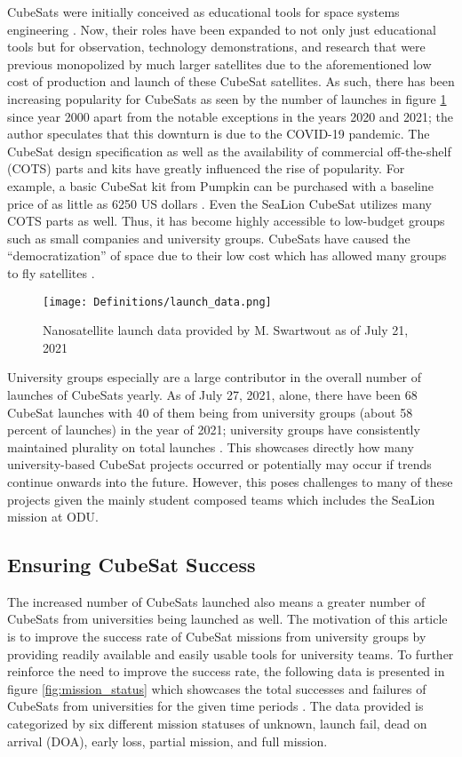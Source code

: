 \documentclass[journal,article,submit,pdftex,moreauthors]{Definitions/mdpi}
\begin{document}
CubeSats were initially conceived as educational tools for space systems engineering \cite{heidt_new}.  Now, their roles have been expanded to not only just educational tools but for observation, technology demonstrations, and research that were previous monopolized by much larger satellites due to the aforementioned low cost of production and launch of these CubeSat satellites.  As such, there has been increasing popularity for CubeSats as seen by the number of launches in figure \ref{fig:launch_data} since year 2000 \cite{swartwout_data} apart from the notable exceptions in the years 2020 and 2021; the author speculates that this downturn is due to the COVID-19 pandemic.  The CubeSat design specification \cite{cds_rev14} as well as the availability of commercial off-the-shelf (COTS) parts and kits have greatly influenced the rise of popularity.  For example, a basic CubeSat kit from Pumpkin can be purchased with a baseline price of as little as 6250 US dollars \cite{pumpkin_cubesat}.  Even the SeaLion CubeSat utilizes many COTS parts as well.  Thus, it has become highly accessible to low-budget groups such as small companies and university groups.  CubeSats have caused the “democratization” of space due to their low cost which has allowed many groups to fly satellites \cite{cubesat_handbook}.  

\begin{figure}[H]
    \texttt{[image: Definitions/launch\_data.png]}
    \caption{Nanosatellite launch data provided by M. Swartwout as of July 21, 2021 \cite{swartwout_data}}
	\label{fig:launch_data}
    \end{figure}
	\noindent   
\unskip

University groups especially are a large contributor in the overall number of launches of CubeSats yearly.  As of July 27, 2021, alone, there have been 68 CubeSat launches with 40 of them being from university groups (about 58 percent of launches) in the year of 2021; university groups have consistently maintained plurality on total launches \cite{swartwout_data}.  This showcases directly how many university-based CubeSat projects occurred or potentially may occur if trends continue onwards into the future.  However, this poses challenges to many of these projects given the mainly student composed teams which includes the SeaLion mission at ODU.

\subsection{Ensuring CubeSat Success}
The increased number of CubeSats launched also means a greater number of CubeSats from universities being launched as well.  The motivation of this article is to improve the success rate of CubeSat missions from university groups by providing readily available and easily usable tools for university teams.  To further reinforce the need to improve the success rate, the following data is presented in figure \ref{fig:mission_status} which showcases the total successes and failures of CubeSats from universities for the given time periods \cite{reliving_24}.  The data provided is categorized by six different mission statuses of unknown, launch fail, dead on arrival (DOA), early loss, partial mission, and full mission.
\end{document}
